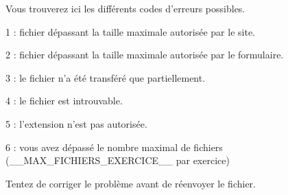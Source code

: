 ﻿Vous trouverez ici les différents codes d'erreurs possibles.
\item 1 : fichier dépassant la taille maximale autorisée par le site.
\item 2 : fichier dépassant la taille maximale autorisée par le formulaire.
\item 3 : le fichier n'a été transféré que partiellement.
\item 4 : le fichier est introuvable.
\item 5 : l'extension n'est pas autorisée.
\item 6 : vous avez dépassé le nombre maximal de fichiers (__MAX_FICHIERS_EXERCICE__ par exercice)

Tentez de corriger le problème avant de réenvoyer le fichier.